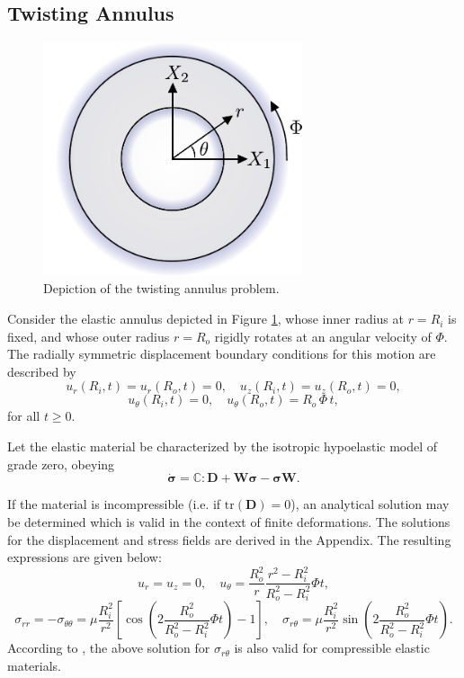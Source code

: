 \subsection*{Twisting Annulus}

\begin{figure}[!h]
  \centering
  \includegraphics[width=3.0in]{figures/twisting_annulus_problem.pdf}  		\caption{Depiction of the twisting annulus problem.}
  \label{fig:twisting_annulus_problem}
\end{figure}
Consider the elastic annulus depicted in Figure \ref{fig:twisting_annulus_problem}, whose inner radius at $r = R_i$ is fixed, and whose outer radius $r = R_o$ rigidly rotates at an angular velocity of $\Phi$. The radially symmetric displacement boundary conditions for this motion are described by
\begin{equation}
	u_r (R_i,t) = u_r (R_o,t) = 0, \quad u_z (R_i,t) = u_z (R_o,t) = 0,
\end{equation}
\begin{equation}
	u_\theta (R_i,t) = 0, \quad u_\theta (R_o,t) = R_o \, \Phi \, t,
\end{equation}
for all $t \geq 0$.

Let the elastic material be characterized by the isotropic hypoelastic model of grade zero, obeying
\begin{equation}
  \dot{\boldsymbol{\sigma}} = \mathbb{C} : \mathbf{D} + \mathbf{W} \boldsymbol{\sigma} - \boldsymbol{\sigma} \mathbf{W}.
\end{equation}

If the material is incompressible (i.e. if $\text{tr} (\mathbf{D}) = 0$), an analytical solution may be determined which is valid in the context of finite deformations. The solutions for the displacement and stress fields are derived in the Appendix. The resulting expressions are given below:
\begin{equation}
  u_r = u_z = 0, \quad u_\theta = \frac{R_o^2}{r} \frac{r^2 - R_i^2}{R_o^{2} - R_i^{2}} \Phi t,
  	\label{eq:annulus_u_exact}
\end{equation}
\begin{equation}
  \sigma_{rr} = - \sigma_{\theta \theta} = \mu \frac{R_i^{2}}{r^{2}} \left[ \cos \left( 2 \frac{R_o^{2}}{R_o^{2} - R_i^{2}} \Phi t \right) - 1 \right], \quad \sigma_{r \theta} = \mu \frac{R_i^{2}}{r^{2}} \sin \left( 2 \frac{R_o^{2}}{R_o^{2} - R_i^{2}} \Phi t \right).
  	\label{eq:annulus_s_exact}
\end{equation}
According to \cite{Brannon:11}, the above solution for $\sigma_{r \theta}$ is also valid for compressible elastic materials.


